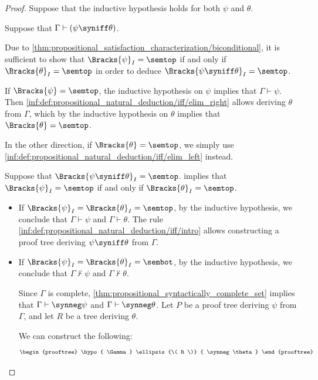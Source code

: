 \begin{proof}
   Suppose that the inductive hypothesis holds for both \( \psi \) and \( \theta \).

  \SufficiencySubProof* Suppose that \( \Gamma \vdash (\psi \syniff \theta) \).

  Due to \cref{thm:propositional_satisfaction_characterization/biconditional}, it is sufficient to show that \( \Bracks{\psi}_I = \semtop \) if and only if \( \Bracks{\theta}_I = \semtop \) in order to deduce \( \Bracks{\psi \syniff \theta}_I = \semtop \).

  If \( \Bracks{\psi} = \semtop \), the inductive hypothesis on \( \psi \) implies that \( \Gamma \vdash \psi \). Then \ref{inf:def:propositional_natural_deduction/iff/elim_right} allows deriving \( \theta \) from \( \Gamma \), which by the inductive hypothesis on \( \theta \) implies that \( \Bracks{\theta} = \semtop \).

  In the other direction, if \( \Bracks{\theta} = \semtop \), we simply use \ref{inf:def:propositional_natural_deduction/iff/elim_left} instead.

  \NecessitySubProof* Suppose that \( \Bracks{\psi \syniff \theta}_I = \semtop \).  implies that \( \Bracks{\psi}_I = \semtop \) if and only if \( \Bracks{\theta}_I = \semtop \).

  \begin{itemize}
    \item If \( \Bracks{\psi}_I = \Bracks{\theta}_I = \semtop \), by the inductive hypothesis, we conclude that \( \Gamma \vdash \psi \) and \( \Gamma \vdash \theta \). The rule \ref{inf:def:propositional_natural_deduction/iff/intro} allows constructing a proof tree deriving \( \psi \syniff \theta \) from \( \Gamma \).

    \item If \( \Bracks{\psi}_I = \Bracks{\theta}_I = \sembot \), by the inductive hypothesis, we conclude that \( \Gamma \nvdash \psi \) and \( \Gamma \nvdash \theta \).

    Since \( \Gamma \) is complete, \cref{thm:propositional_syntactically_complete_set} implies that \( \Gamma \vdash \synneg \psi \) and \( \Gamma \vdash \synneg \theta \). Let \( P \) be a proof tree deriving \( \psi \) from \( \Gamma \), and let \( R \) be a tree deriving \( \theta \).

    We can construct the following:
    \begin{equation*}
      \begin{prooftree}
        \hypo{ \Gamma }
        \ellipsis {\( R \)} { \synneg \theta }


\end{prooftree}
\end{equation*}
\end{itemize}
\end{proof}

